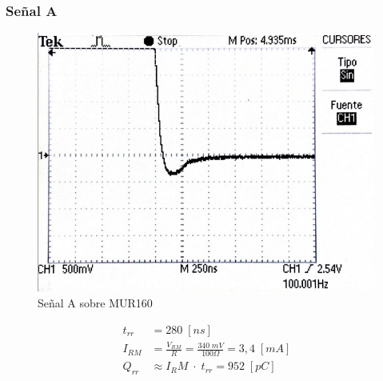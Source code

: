 \documentclass{article}
\begin{document}
\subsubsection{Señal A}
\begin{figure}[h!]
 \begin{center}
	\includegraphics[scale=0.4]{imagenes/MUR_A.jpg} 
	\caption{Señal A sobre MUR160}
 \end{center}
\end{figure}
\begin{align*}
	t_{rr} &= 280 \; [ns] \\
	I_{RM}	&= \frac{V_{RM}}{R} = \frac{340 \; mV}{100 \Omega} = 3,4 \; [mA] \\
	Q_{rr}	&\approx {I_RM} \; \cdot \; t_{rr} = 952 \; [pC]
\end{align*}
%
\end{document}
